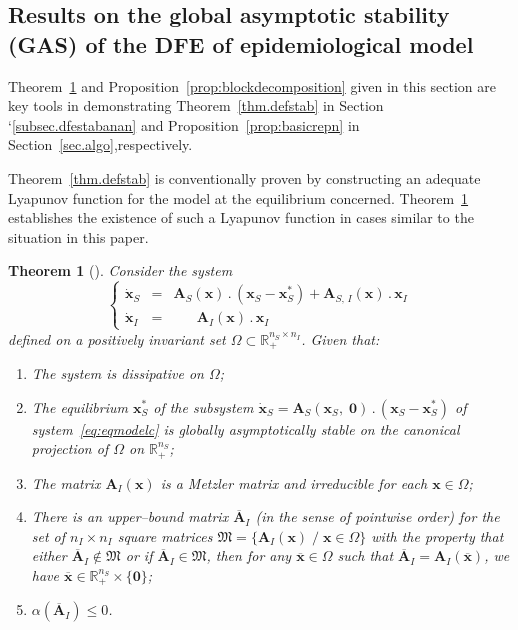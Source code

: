 \documentclass[a4paper]{article}
\newtheorem{thm}{Theorem}[section]
\begin{document}
{\subsection{Results on the global asymptotic stability (GAS) of the DFE of epidemiological model} Theorem~\ref{thm:kamsal} and Proposition~\ref{prop:blockdecomposition} given in this section  are key tools in demonstrating Theorem~\ref{thm.defstab} in Section
`\ref{subsec.dfestabanan} and Proposition~\ref{prop:basicrepn} in Section~\ref{sec.algo},respectively. 

Theorem~\ref{thm.defstab} is conventionally proven by constructing an adequate Lyapunov function for the model at the equilibrium concerned. Theorem~\ref{thm:kamsal} establishes the existence of such a Lyapunov function in cases similar to the situation in this paper.

\begin{thm}[\cite{KamSal07}]\label{thm:kamsal}Consider the system  
 \begin{equation} \label{eq:eqmodelc} \left\{\begin{array}{ccr}\dot{\mathbf x}_S & = & \mathbf
A_S(\mathbf x)\,.\, \left(\mathbf x_S - \mathbf x^*_S\right)  +  \mathbf A_{S,\,I}(\mathbf x)\,.\,\mathbf x_I \\
   \dot{\mathbf x}_I & = & \;\;\;\;\;\;\mathbf A_I(\mathbf x)\,.\,\mathbf x_I
\end{array}\right. \end{equation}
defined on a positively invariant set $\Omega\subset\mathbb R_+^{n_S\times n_I}$.  Given that:
\begin{enumerate}[{\bf h}1:]
\item The system is  dissipative on $\Omega$;
\item The equilibrium $\mathbf x_S^*$ of the subsystem $\dot{\mathbf x}_S = \mathbf A_S\left(\mathbf x_S,\;\mathbf 0\right)\,.\,(\mathbf x_S-\mathbf x^*_S)$ of system~\eqref{eq:eqmodelc} is globally asymptotically stable   on the canonical projection of $\Omega$ on $\mathbb R_+^{n_S}$;
\item The matrix $\mathbf A_I(\mathbf x)$ is a Metzler matrix  and irreducible for each $\mathbf x\in\Omega$;
\item There is an upper--bound matrix $\overline{\mathbf A}_I$ (in the sense of pointwise order) for the set of $n_I\times n_I$ square matrices  $\mathfrak{M} = \{\mathbf A_I(\mathbf x)\;/\;\mathbf x\in\Omega\}$ with the property that either $\overline{\mathbf A}_I\not \in\mathfrak{M}$ or if $\overline{\mathbf A}_I \in\mathfrak{M}$, then for any $\overline{\mathbf x}\in\Omega$ such that $\overline{\mathbf A}_I = \mathbf A_I(\overline{\mathbf x})$, we have $\overline{\mathbf x}\in\mathbb R_+^{n_S}\times\{\mathbf 0\}$;
\item $\alpha(\overline{\mathbf A}_I)\leq 0$.
\end{enumerate}


\end{thm}}
\end{document}
